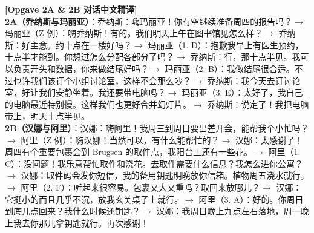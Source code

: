 \begin{transbox}
\small
\textbf{\color{NCDTeal}[Opgave 2A \& 2B 对话中文精译]}\\
\textbf{2A（乔纳斯与玛丽亚）}：乔纳斯：嗨玛丽亚！你有空继续准备周四的报告吗？$\rightarrow$ 玛丽亚（Z 例）：嗨乔纳斯！有的。我们明天上午在图书馆见怎么样？$\rightarrow$ 乔纳斯：好主意。约十点在一楼好吗？$\rightarrow$ 玛丽亚（1. D）：抱歉我早上有医生预约，十点半才能到。你想过怎么分配各部分了吗？$\rightarrow$ 乔纳斯：行，那十点半见。我可以负责开头和数据，你来做结尾好吗？$\rightarrow$ 玛丽亚（2. B）：我做结尾很合适。不过也许我们该订个小组讨论室，这样不会那么吵？$\rightarrow$ 乔纳斯：我今天去订讨论室，好让我们安静坐着。我还要带电脑吗？$\rightarrow$ 玛丽亚（3. E）：太好了，我自己的电脑最近特别慢。这样我们也更好合并幻灯片。$\rightarrow$ 乔纳斯：说定了！我把电脑带上，明天十点半见。\\[3pt]
\textbf{2B（汉娜与阿里）}：汉娜：嗨阿里！我周三到周日要出差开会，能帮我个小忙吗？$\rightarrow$ 阿里（Z 例）：嗨汉娜！当然可以，有什么能帮忙的？$\rightarrow$ 汉娜：太感谢了！周四有个重要包裹会到 Brugsen 的取件点，我阳台上还有一些花。$\rightarrow$ 阿里（1. C）：没问题！我乐意帮忙取件和浇花。去取件需要什么信息？我怎么进你公寓？$\rightarrow$ 汉娜：取件码会发你短信，我的备用钥匙明晚放你信箱。植物周五浇水就行。$\rightarrow$ 阿里（2. F）：听起来很容易。包裹又大又重吗？取回来放哪儿？$\rightarrow$ 汉娜：它挺小的而且几乎不沉，放我玄关桌子上就行。$\rightarrow$ 阿里（3. A）：好的。你周日到底几点回来？我什么时候还钥匙？$\rightarrow$ 汉娜：我周日晚上九点左右落地，周一晚上我去你那儿拿钥匙就行。再次感谢！
\end{transbox}

